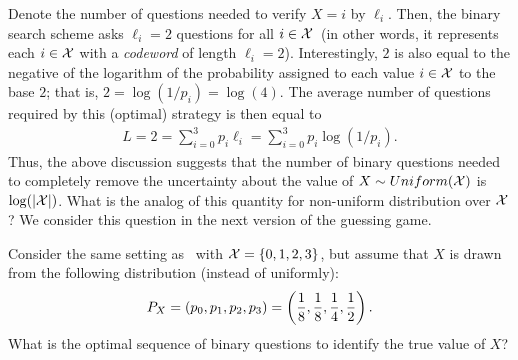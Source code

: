         Denote the number of questions needed to verify $X=i$ by $\ell_i$. Then, the binary search scheme asks $\ell_i=2$ questions for all $i \in \mathcal{X}$~(in other words, it represents each $i \in \mathcal{X}$ with a \emph{codeword} of length $\ell_i=2$). Interestingly, $2$ is also equal to  the negative of the logarithm of the probability assigned to each value $i \in \mathcal{X}$ to the base $2$; that is, $2 = \log(1/p_i) = \log(4)$. The average number of questions required by this (optimal) strategy is then equal to
        \begin{align}
            L = 2 = \sum_{i=0}^{3} p_i \ell_i = \sum_{i=0}^3 p_i \log (1/p_i). 
        \end{align}
        Thus, the above discussion suggests that the number of binary questions needed to completely remove the uncertainty about the value of $X \sim Uniform(\mathcal{X})$ is $\log(|\mathcal{X}|)$. What is the analog of this quantity for  non-uniform distribution over $\mathcal{X}$? We consider this question in the next version of the guessing game. 
% 
        \begin{question} 
            \label{question:guessing-game-II}
            Consider the same setting as~ with $\mathcal{X} = \{0, 1, 2, 3\}$, but assume that $X$ is drawn from the following distribution (instead of uniformly): 
            \begin{align}
                P_X = (p_0, p_1, p_2, p_3) = \left( \frac{1}{8}, \frac{1}{8}, \frac{1}{4}, \frac{1}{2} \right). 
            \end{align}
            What is the optimal sequence of binary questions to identify the true value of $X$? 
        \end{question}

